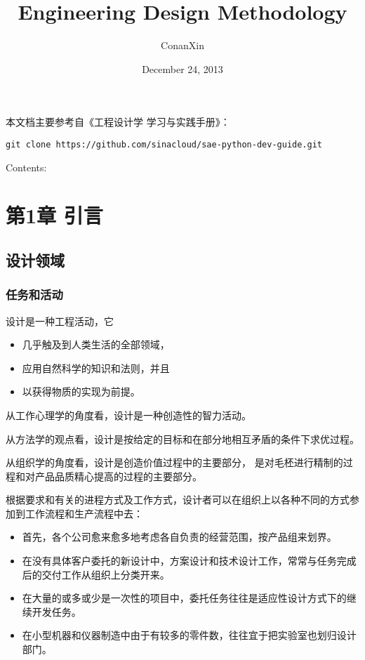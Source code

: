 \documentclass[letterpaper,10pt,english]{sphinxmanual}
\title{Engineering Design Methodology}
\date{December 24, 2013}
\author{ConanXin}
\begin{document}
\maketitle
\tableofcontents
{}\label{index::doc}


本文档主要参考自《工程设计学 学习与实践手册》：

\begin{Verbatim}[commandchars=\\\{\}]
git clone https://github.com/sinacloud/sae-python-dev-guide.git
\end{Verbatim}

Contents:


\chapter{第1章 引言}
\label{unit1::doc}\label{unit1:id1}

\section{设计领域}
\label{unit1:id2}

\subsection{任务和活动}
\label{unit1:id3}
设计是一种工程活动，它
\begin{itemize}
\item {} 
几乎触及到人类生活的全部领域，

\item {} 
应用自然科学的知识和法则，并且

\item {} 
以获得物质的实现为前提。

\end{itemize}

从工作心理学的角度看，设计是一种创造性的智力活动。

从方法学的观点看，设计是按给定的目标和在部分地相互矛盾的条件下求优过程。

从组织学的角度看，设计是创造价值过程中的主要部分，
是对毛柸进行精制的过程和对产品品质精心提高的过程的主要部分。

根据要求和有关的进程方式及工作方式，设计者可以在组织上以各种不同的方式参加到工作流程和生产流程中去：
\begin{itemize}
\item {} 
首先，各个公司愈来愈多地考虑各自负责的经营范围，按产品组来划界。

\item {} 
在没有具体客户委托的新设计中，方案设计和技术设计工作，常常与任务完成后的交付工作从组织上分类开来。

\item {} 
在大量的或多或少是一次性的项目中，委托任务往往是适应性设计方式下的继续开发任务。

\item {} 
在小型机器和仪器制造中由于有较多的零件数，往往宜于把实验室也划归设计部门。

\end{itemize}
\end{document}
